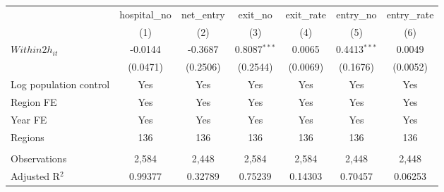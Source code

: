 \begingroup
\centering
\begin{tabular}{lcccccc}
   \toprule
                          & hospital\_no  & net\_entry  & exit\_no       & exit\_rate  & entry\_no      & entry\_rate \\    
                          & (1)           & (2)         & (3)            & (4)         & (5)            & (6)\\  
   \midrule 
   $Within2h_{it}$        & -0.0144       & -0.3687     & 0.8087$^{***}$ & 0.0065      & 0.4413$^{***}$ & 0.0049\\   
                          & (0.0471)      & (0.2506)    & (0.2544)       & (0.0069)    & (0.1676)       & (0.0052)\\   
   Log population control & Yes           & Yes         & Yes            & Yes         & Yes            & Yes\\  
   Region FE              & Yes           & Yes         & Yes            & Yes         & Yes            & Yes\\  
   Year FE                & Yes           & Yes         & Yes            & Yes         & Yes            & Yes\\  
   Regions                & 136           & 136         & 136            & 136         & 136            & 136\\  
    \\
   Observations           & 2,584         & 2,448       & 2,584          & 2,584       & 2,448          & 2,448\\  
   Adjusted R$^2$         & 0.99377       & 0.32789     & 0.75239        & 0.14303     & 0.70457        & 0.06253\\  
   \bottomrule
\end{tabular}
\par\endgroup
